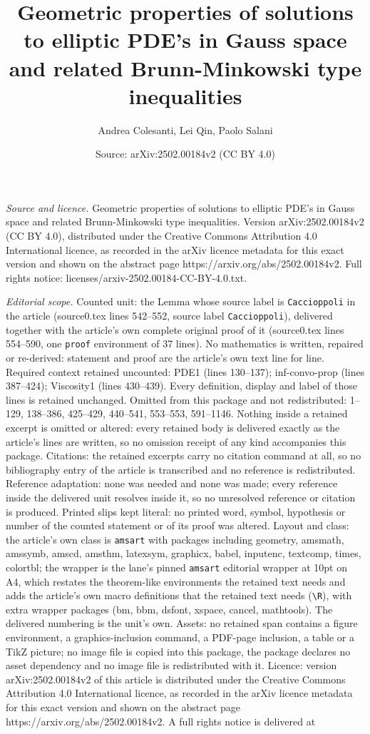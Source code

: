 \documentclass[10pt,a4paper]{amsart}
\title[Geometric properties of solutions to elliptic PDE's in Gauss]{Geometric properties of solutions to elliptic PDE's in Gauss space and related Brunn-Minkowski type inequalities}
\author{Andrea Colesanti, Lei Qin, Paolo Salani}
\date{Source: arXiv:2502.00184v2 (CC BY 4.0)}
\begin{document}
\maketitle

\noindent\emph{Source and licence.} Geometric properties of solutions to elliptic PDE's in Gauss space and related Brunn-Minkowski type inequalities. Version arXiv:2502.00184v2 (CC BY 4.0), distributed under the Creative Commons Attribution 4.0 International licence, as recorded in the arXiv licence metadata for this exact version and shown on the abstract page https://arxiv.org/abs/2502.00184v2. Full rights notice: licenses/arxiv-2502.00184-CC-BY-4.0.txt.\par\smallskip

\noindent\textit{Editorial scope.} Counted unit: the Lemma whose source label is \texttt{Caccioppoli} in the article (source0.tex lines 542--552, source label \texttt{Caccioppoli}), delivered together with the article's own complete original proof of it (source0.tex lines 554--590, one \texttt{proof} environment of 37 lines). No mathematics is written, repaired or re-derived: statement and proof are the article's own text line for line. Required context retained uncounted: PDE1 (lines 130--137); inf-convo-prop (lines 387--424); Viscosity1 (lines 430--439). Every definition, display and label of those lines is retained unchanged. Omitted from this package and not redistributed: 1--129, 138--386, 425--429, 440--541, 553--553, 591--1146. Nothing inside a retained excerpt is omitted or altered: every retained body is delivered exactly as the article's lines are written, so no omission receipt of any kind accompanies this package. Citations: the retained excerpts carry no citation command at all, so no bibliography entry of the article is transcribed and no reference is redistributed. Reference adaptation: none was needed and none was made; every reference inside the delivered unit resolves inside it, so no unresolved reference or citation is produced. Printed slips kept literal: no printed word, symbol, hypothesis or number of the counted statement or of its proof was altered. Layout and class: the article's own class is \texttt{amsart} with packages including geometry, amsmath, amssymb, amscd, amsthm, latexsym, graphicx, babel, inputenc, textcomp, times, colortbl; the wrapper is the lane's pinned \texttt{amsart} editorial wrapper at 10pt on A4, which restates the theorem-like environments the retained text needs and adds the article's own macro definitions that the retained text needs (\texttt{\textbackslash R}), with extra wrapper packages (bm, bbm, dsfont, xspace, cancel, mathtools). The delivered numbering is the unit's own. Assets: no retained span contains a figure environment, a graphics-inclusion command, a PDF-page inclusion, a table or a TikZ picture; no image file is copied into this package, the package declares no asset dependency and no image file is redistributed with it. Licence: version arXiv:2502.00184v2 of this article is distributed under the Creative Commons Attribution 4.0 International licence, as recorded in the arXiv licence metadata for this exact version and shown on the abstract page https://arxiv.org/abs/2502.00184v2. A full rights notice is delivered at 
\end{document}
